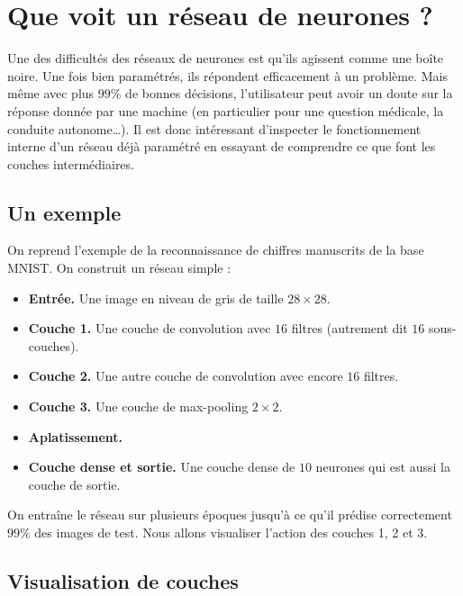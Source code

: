 \documentclass[11pt,class=report,crop=false]{standalone}
\begin{document}
\section{Que voit un réseau de neurones ?}

Une des difficultés des réseaux de neurones est qu'ils agissent comme une \og{}boîte noire\fg{}. Une fois bien paramétrés, ils répondent efficacement à un problème. Mais même avec plus $99\%$ de bonnes décisions, l'utilisateur peut avoir un doute sur la réponse donnée par une machine (en particulier pour une question médicale, la conduite autonome\ldots). Il est donc intéressant d'inspecter le fonctionnement interne d'un réseau déjà paramétré en essayant de comprendre ce que font les couches intermédiaires.


\subsection{Un exemple}

On reprend l'exemple de la reconnaissance de chiffres manuscrits de la base MNIST. On construit un réseau simple :
\begin{itemize}
  \item \textbf{Entrée.} Une image en niveau de gris de taille $28\times 28$.
  \item \textbf{Couche 1.} Une couche de convolution avec $16$ filtres (autrement dit $16$ sous-couches).
  \item \textbf{Couche 2.} Une autre couche de convolution avec encore $16$ filtres.
  \item \textbf{Couche 3.} Une couche de max-pooling $2\times2$.
  \item \textbf{Aplatissement.} 
  \item \textbf{Couche dense et sortie.} Une couche dense de  $10$ neurones qui est aussi la couche de sortie.
\end{itemize}


On entraîne le réseau sur plusieurs époques jusqu'à ce qu'il prédise correctement $99\%$ des images de test.
Nous allons visualiser l'action des couches 1, 2 et 3.


\subsection{Visualisation de couches}
\end{document}
